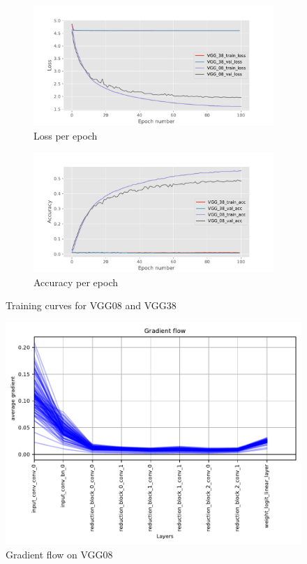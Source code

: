 \documentclass{article}
\begin{document}
\begin{figure}[t]
    \begin{subfigure}{\linewidth}
        \centering
        \includegraphics[width=\linewidth]{figures/loss_plot.pdf}
        \caption{Loss per epoch}
        \label{fig:loss_curves}
    \end{subfigure}

    \begin{subfigure}{\linewidth}
        \centering
        \includegraphics[width=\linewidth]{figures/accuracy_plot.pdf}
        \caption{Accuracy per epoch}
        \label{fig:acc_curves}
    \end{subfigure}
    \caption{Training curves for VGG08 and VGG38}
    \label{fig:curves}
\end{figure}

\begin{figure}[t]
    \centering
    \includegraphics[width=\linewidth]{figures/grad_flow_vgg08.pdf}
    \caption{Gradient flow on VGG08}
    \label{fig:grad_flow_08}
\end{figure}
\end{document}
